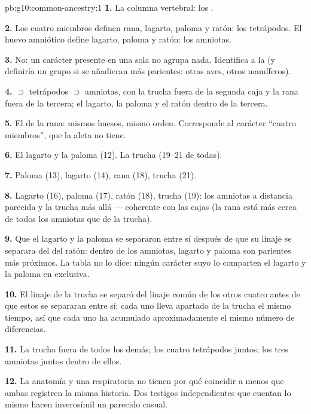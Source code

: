 \begin{solution}{pb:g10:common-ancestry:1}
\textbf{1.} La columna vertebral: los .

\textbf{2.} Los cuatro miembros definen rana, lagarto, paloma y ratón:
los tetrápodos. El huevo amniótico define lagarto, paloma y ratón: los
amniotas.

\textbf{3.} No: un carácter presente en una sola  no agrupa
nada. Identifica a la  (y definiría un grupo si se añadieran más
parientes: otras aves, otros mamíferos).

\textbf{4.}  $\supset$ tetrápodos $\supset$ amniotas, con la
trucha fuera de la segunda caja y la rana fuera de la tercera; el
lagarto, la paloma y el ratón dentro de la tercera.

\textbf{5.} El de la rana: mismos huesos, mismo orden. Corresponde al
carácter ``cuatro miembros'', que la aleta no tiene.

\textbf{6.} El lagarto y la paloma (12). La trucha (19--21 de todas).

\textbf{7.} Paloma (13), lagarto (14), rana (18), trucha (21).

\textbf{8.} Lagarto (16), paloma (17), ratón (18), trucha (19): los
amniotas a distancia parecida y la trucha más allá --- coherente con
las cajas (la rana está más cerca de todos los amniotas que de la
trucha).

\textbf{9.} Que el lagarto y la paloma se separaron entre sí después de
que su linaje se separara del del ratón: dentro de los amniotas,
lagarto y paloma son parientes más próximos. La tabla no lo dice:
ningún carácter suyo lo comparten el lagarto y la paloma en exclusiva.

\textbf{10.} El linaje de la trucha se separó del linaje común de los
otros cuatro antes de que estos se separaran entre sí: cada uno lleva
apartado de la trucha el mismo tiempo, así que cada uno ha acumulado
aproximadamente el mismo número de diferencias.

\textbf{11.} La trucha fuera de todos los demás; los cuatro tetrápodos
juntos; los tres amniotas juntos dentro de ellos.

\textbf{12.} La anatomía y una  respiratoria no tienen por qué
coincidir a menos que ambas registren la misma historia. Dos testigos
independientes que cuentan lo mismo hacen inverosímil un parecido
casual.


\end{solution}

